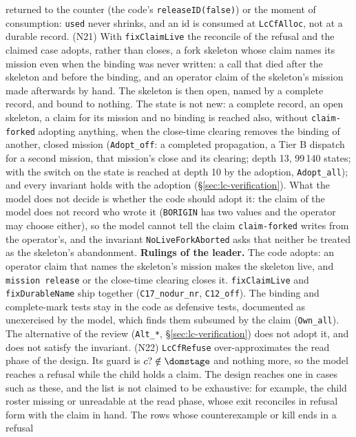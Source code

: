 \documentclass[a4paper,10pt,fleqn]{article}
\newcommand{\field}[1]{\texttt{#1}}
\begin{document}
returned to the counter (the code's \texttt{releaseID(false)}) or the moment
of consumption: \field{used} never shrinks, and an id is consumed at
\field{LcCfAlloc}, not at a durable record.
(N21) With \field{fixClaimLive} the reconcile of the refusal and the claimed
case adopts, rather than closes, a fork skeleton whose claim names its mission
even when the binding was never written: a call that died after the skeleton
and before the binding, and an operator claim of the skeleton's mission made
afterwards by hand. The skeleton is then open, named by a complete record, and
bound to nothing. The state is not new: a complete record, an open skeleton, a
claim for its mission and no binding is reached also, without \field{claim-forked}
adopting anything, when the close-time clearing removes the binding of another,
closed mission (\texttt{Adopt\_off}: a completed propagation, a Tier B
dispatch for a second mission, that mission's close and its clearing; depth 13,
99\,140 states; with the switch on the state is reached at depth 10 by the
adoption, \texttt{Adopt\_all}); and every invariant holds with the adoption
(\S\ref{sec:lc-verification}). What the model does not decide is
whether the code should adopt it: the claim of the model does not record who
wrote it (\field{BORIGIN} has two values and the operator may choose either),
so the model cannot tell the claim \field{claim-forked} writes from the
operator's, and the invariant \field{NoLiveForkAborted} asks that neither be
treated as the skeleton's abandonment. \textbf{Rulings of the leader.} The
code adopts: an operator claim that names the skeleton's mission makes the
skeleton live, and \field{mission release} or the close-time clearing closes it.
\field{fixClaimLive} and \field{fixDurableName} ship together
(\texttt{C17\_nodur\_nr}, \texttt{C12\_off}). The binding and complete-mark tests stay in the code as
defensive tests, documented as unexercised by the model, which finds them
subsumed by the claim (\texttt{Own\_all}). The alternative of the review
(\texttt{Alt\_*}, \S\ref{sec:lc-verification}) does not adopt it, and does not
satisfy the invariant.
(N22) \field{LcCfRefuse} over-approximates the read phase of the design. Its
guard is $c?\notin\dom\field{stage}$ and nothing more, so the model reaches a
refusal while the child holds a claim. The design reaches one in cases such as
these, and the list is not claimed to be exhaustive: for example, the child
roster missing or unreadable at the read phase, whose exit reconciles in
refusal form with the claim in hand. The rows whose counterexample or kill ends in a refusal
\end{document}

